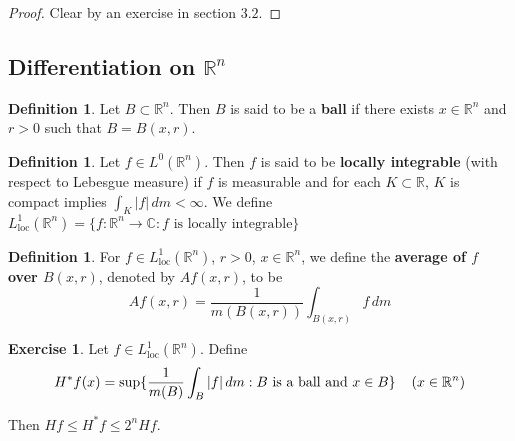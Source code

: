 \documentclass[12pt]{amsart}
\theoremstyle{definition}
\newtheorem{defn}[definition]{Definition}
\newtheorem{ex}[definition]{Exercise}
\newcommand{\C}{\mathbb{C}}
\newcommand{\R}{\mathbb{R}}
\newcommand{\dm}{\, d m}
\newcommand{\Ll}{L^1_{\text{loc}}(\R^n)}
\newcommand{\lex}[1]{\label{ex:#1}}
\newcommand{\ld}[1]{\label{defn:#1}}
\begin{document}
	\begin{proof}
	Clear by an exercise in section $3.2$.
	\end{proof}
	
	
	
	
	
	
	
	
	
	
	
	
	
	
	
	
	
	
	
	
	
	
	
	
	
	
	
	
	

	
	
	
	
	
	
	
	
	\newpage
	\subsection{Differentiation on $\R^n$}
	
	\begin{defn} \ld{00000} 
		Let $B \subset \R^n$. Then $B$ is said to be a \textbf{ball} if there exists $x \in \R^n$ and $r > 0$ such that $B = B(x, r)$. 
	\end{defn}
	
	\begin{defn} \ld{00000} 
		Let $f \in L^0(\R^n)$. Then $f$ is said to be \textbf{locally integrable} (with respect to Lebesgue measure) if $f$ is measurable and for each $K \subset \R$, $K$ is compact implies $\int_K |f| \dm < \infty$. We define $L^1_{\text{loc}}(\R^n) = \{f:\R^n \rightarrow \C: f \text{ is locally integrable}\}$
	\end{defn}
	
	\begin{defn} \ld{00000} 
		For $f \in \Ll$, $r>0$, $x \in \R^n$, we define the \textbf{average of $f$ over $B(x,r)$}, denoted by $Af(x,r)$, to be $$Af(x,r) = \frac{1}{m(B(x,r))}\int_{B(x,r)}f\dm$$
	\end{defn}
	
	\begin{ex} \lex{00000} 
		Let $f \in \Ll$. Define $$H^*f(x) = \sup\{\frac{1}{m(B)}\int_{B}|f|\dm: B \text{ is a ball and } x \in B\} \hspace{4mm} (x \in \R^n)$$
		
		Then $Hf \leq H^*f \leq 2^n Hf$. 
	\end{ex}
	
\end{document}
